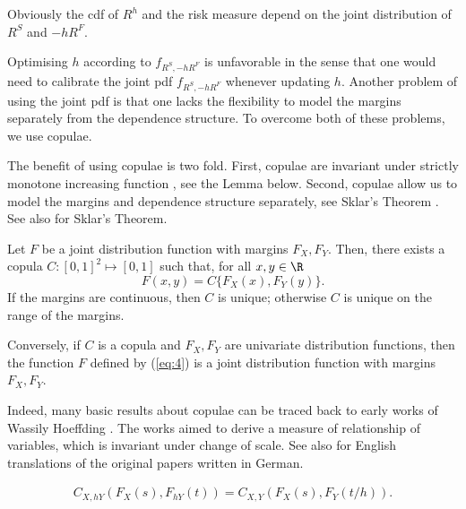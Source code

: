 Obviously the cdf of $R^h$ and the risk measure depend on the joint distribution of $R^S$ and $-hR^F$. \medskip

Optimising $h$ according to $f_{R^S,-hR^F}$ is unfavorable in the
sense that one would need to calibrate the joint pdf $f_{R^S,-hR^F}$
whenever updating $h$.
Another problem of using the joint pdf is that one lacks the
flexibility to model the margins separately from the dependence structure.
To overcome both of these problems, we use copulae. \medskip

The benefit of using copulae is two fold.
First, copulae are invariant under strictly
monotone increasing function \citep{schweizer1981nonparametric}, see the Lemma below.
Second, copulae allow us to model the  margins and dependence structure separately, see Sklar's Theorem
\citep{Sklar1959}.
See also \citep{Nelsen1999, joe1997multivariate, McNeil2005} for Sklar's Theorem. \medskip

\begin{theorem}
  Let $F$ be a joint distribution function with margins $F_X,
  F_Y$. Then, there exists a copula $C:[0,1]^2 \mapsto [0,1]$ such
  that, for all $x,y\in \R$
  \begin{equation}
    \label{eq:4}
    F(x,y)=C\{F_X(x), F_Y(y)\}.
  \end{equation}
  If the margins are continuous, then $C$ is unique; otherwise $C$ is
  unique on the range of the margins.

  Conversely, if $C$ is a copula and $F_X, F_Y$ are univariate
  distribution functions, then the function $F$ defined by (\ref{eq:4})
  is a joint distribution function with margins $F_X, F_Y$.
\end{theorem}

Indeed, many basic results about copulae can be traced back to early
works of Wassily Hoeffding \citep{hoedffding1940, hoedffding1941}. 
The works aimed to derive a measure of relationship of variables,
which is invariant under change of scale. 
See also \citet{hoeffding2012collected} for English translations of
the original papers written in German. 

\begin{lemma}
  \begin{align}
  C_{X, hY}\left(F_X(s),F_{hY}(t)\right) = C_{X, Y}\left(F_X(s),F_{Y}(t/h)\right).
    \end{align}
  \end{lemma}

